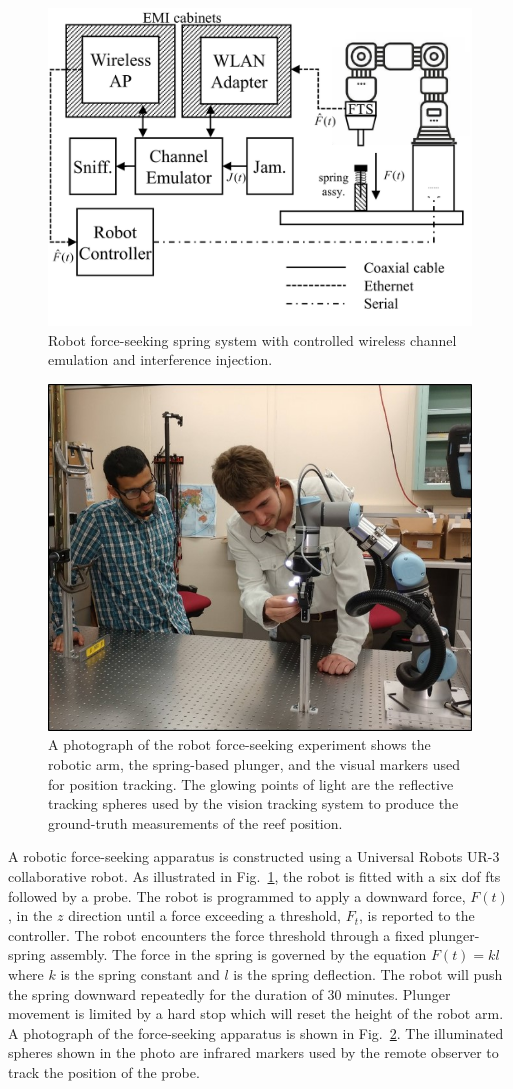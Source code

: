 \begin{figure}[!tbp]
	\centering
	\includegraphics[width=0.65\columnwidth]{./chapter-ftml/diagrams/robotsetup}
	\caption{Robot force-seeking spring system with controlled wireless channel emulation and interference injection.}
	\label{fig:robotsetup}
\end{figure}

\begin{figure}[!tbp]
	\centering
	\includegraphics[width=0.65\columnwidth]{./chapter-ftml/images/PlungerExperiment}
	\caption{A photograph of the robot force-seeking experiment shows the robotic arm, the spring-based plunger, and the visual markers used for position tracking.  The glowing points of light are the reflective tracking spheres used by the vision tracking system to produce the ground-truth measurements of the \acrshort{reef} position.}
	\label{fig:photo-forceseeker}
\end{figure}	

A robotic force-seeking apparatus is constructed using a Universal Robots UR-3 collaborative robot.  As illustrated in Fig.~\ref{fig:robotsetup}, the robot is fitted with a six \gls{dof} \gls{fts} followed by a probe.  The robot is programmed to apply a downward force, $F(t)$, in the $z$ direction until a force exceeding a threshold, $F_t$, is reported to the controller.  The robot encounters the force threshold through a fixed plunger-spring assembly.  The force in the spring is governed by the equation $F(t)=kl$ where $k$ is the spring constant and $l$ is the spring deflection.  The robot will push the spring downward repeatedly for the duration of 30 minutes.  Plunger movement is limited by a hard stop which will reset the height of the robot arm.  A photograph of the force-seeking apparatus is shown in Fig.~\ref{fig:photo-forceseeker}.  The illuminated spheres shown in the photo are infrared markers used by the remote observer to track the position of the probe.

